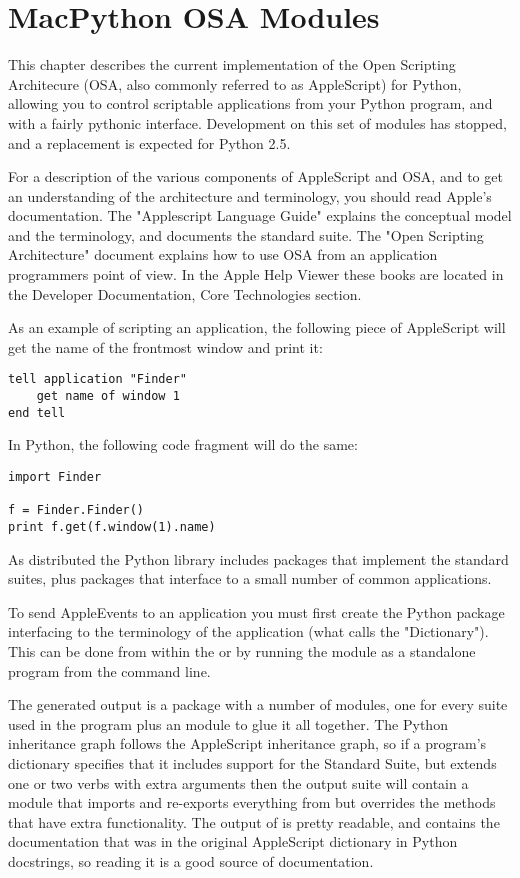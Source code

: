 \chapter{MacPython OSA Modules \label{scripting}}

This chapter describes the current implementation of the Open Scripting
Architecure (OSA, also commonly referred to as AppleScript) for Python, allowing
you to control scriptable applications from your Python program,
and with a fairly pythonic interface. Development on this set of modules
has stopped, and a replacement is expected for Python 2.5.

For a description of the various components of AppleScript and OSA, and
to get an understanding of the architecture and terminology, you should
read Apple's documentation. The "Applescript Language Guide" explains
the conceptual model and the terminology, and documents the standard
suite. The "Open Scripting Architecture" document explains how to use
OSA from an application programmers point of view. In the Apple Help
Viewer these books are located in the Developer Documentation, Core
Technologies section.


As an example of scripting an application, the following piece of
AppleScript will get the name of the frontmost  window
and print it:
	
\begin{verbatim}
tell application "Finder"
    get name of window 1
end tell
\end{verbatim}

In Python, the following code fragment will do the same:

\begin{verbatim}
import Finder

f = Finder.Finder()
print f.get(f.window(1).name)
\end{verbatim}

As distributed the Python library includes packages that implement the
standard suites, plus packages that interface to a small number of
common applications.

To send AppleEvents to an application you must first create the Python
package interfacing to the terminology of the application (what
 calls the "Dictionary"). This can be done from
within the  or by running the
 module as a standalone program from the command
line.

The generated output is a package with a number of modules, one for
every suite used in the program plus an  module to glue
it all together. The Python inheritance graph follows the AppleScript
inheritance graph, so if a program's dictionary specifies that it
includes support for the Standard Suite, but extends one or two verbs
with extra arguments then the output suite will contain a module
 that imports and re-exports everything from
 but overrides the methods that have
extra functionality. The output of  is pretty
readable, and contains the documentation that was in the original
AppleScript dictionary in Python docstrings, so reading it is a good
source of documentation.

